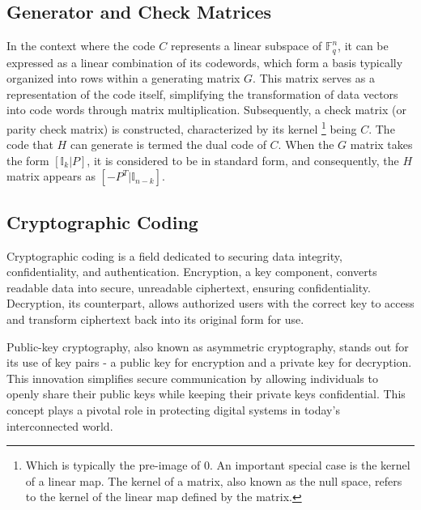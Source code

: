\subsection{Generator and Check Matrices}
In the context where the code $C$  
represents a linear subspace of $\mathbb{F}_q^n$, it can be expressed as 
a linear combination of its codewords, which form a basis typically organized 
into rows within a generating  matrix $G$. 
This matrix serves as a representation  of the code itself, simplifying the 
transformation of data vectors  into code words through 
matrix multiplication. Subsequently, a check 
matrix (or parity check matrix) is constructed, characterized by its kernel 
\footnote{Which is typically the pre-image of 0. An important special case is 
the kernel of a linear map. The kernel of a matrix, also known as the null space, refers to the kernel of the linear map defined by the matrix.} being $C$. The code that $H$ can generate is termed the dual code of $C$. When the $G$ matrix takes the form $[\mathbb{I}_k | P]$, it is considered to be in standard form, and consequently, the $H$ matrix appears as $[-P^T | \mathbb{I}_{n-k}]$.

\subsection{Cryptographic Coding}
Cryptographic coding is a field dedicated to securing data integrity, confidentiality, and authentication. Encryption, a key component, converts readable data into secure, unreadable ciphertext, ensuring confidentiality. Decryption, its counterpart, allows authorized users with the correct key to access and transform ciphertext back into its original form for use.

Public-key cryptography, also known as asymmetric cryptography, stands out for its use of key pairs - a public key for encryption and a private key for decryption. This innovation simplifies secure communication by allowing individuals to openly share their public keys while keeping their private keys confidential. This concept plays a pivotal role in protecting digital systems in today's interconnected world.

